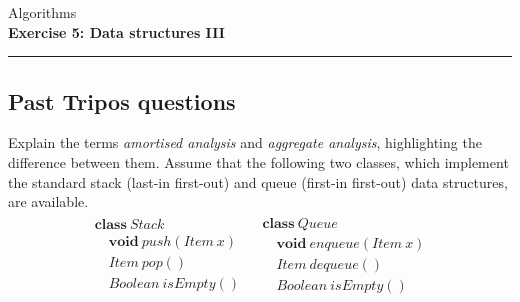 \documentclass[10pt,a4paper,fleqn]{exam}
\begin{document}
\begin{center}
\Large Algorithms \\
\LARGE \textbf{Exercise 5: Data structures III} \\
\end{center}

\hrule

\vspace{0.5cm}

\marksnotpoints
\pointsdroppedatright
\marksnotpoints
\marginpointname{ \points}

\begin{questions}

\section{Past Tripos questions}

\question[3] Explain the terms \emph{amortised analysis} and \emph{aggregate analysis}, highlighting the difference between them. \droppoints 
\question Assume that the following two classes, which implement the standard stack (last-in first-out) and queue (first-in first-out) data structures, are available.
\begin{displaymath}
\begin{array}{cc}
\begin{array}{l}
\mathbf{class}~\mathit{Stack} \\
\quad \mathbf{void}~\mathit{push}(\mathit{Item}~\mathit{x}) \\
\quad \mathit{Item}~\mathit{pop}() \\
\quad \mathit{Boolean}~\mathit{isEmpty}()
\end{array} &
\begin{array}{l}
\mathbf{class}~\mathit{Queue} \\
\quad \mathbf{void}~\mathit{enqueue}(\mathit{Item}~\mathit{x}) \\
\quad \mathit{Item}~\mathit{dequeue}() \\
\quad \mathit{Boolean}~\mathit{isEmpty}()
\end{array}
\end{array}
\end{displaymath}
\begin{parts}

\end{parts}
\end{questions}
\end{document}
